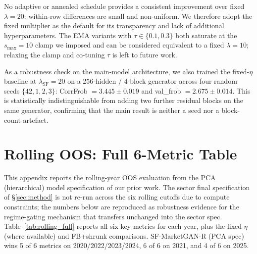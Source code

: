 No adaptive or annealed schedule provides a consistent improvement over fixed $\lambda=20$: within-row differences are small and non-uniform. We therefore adopt the fixed multiplier as the default for its transparency and lack of additional hyperparameters. The EMA variants with $\tau \in \{0.1, 0.3\}$ both saturate at the $s_\text{max}=10$ clamp we imposed and can be considered equivalent to a fixed $\lambda=10$; relaxing the clamp and co-tuning $\tau$ is left to future work.

As a robustness check on the main-model architecture, we also trained the fixed-$\eta$ baseline at $\lambda_\text{SF}{=}20$ on a 256-hidden / 4-block generator across four random seeds $\{42, 1, 2, 3\}$: CorrFrob $= 3.445 \pm 0.019$ and val\_frob $= 2.675 \pm 0.014$. This is statistically indistinguishable from adding two further residual blocks on the same generator, confirming that the main result is neither a seed nor a block-count artefact.

\section{Rolling OOS: Full 6-Metric Table}
\label{app:rolling_full}

This appendix reports the rolling-year OOS evaluation from the PCA (hierarchical) model specification of our prior work. The sector final specification of \S\ref{sec:method} is not re-run across the six rolling cutoffs due to compute constraints; the numbers below are reproduced as robustness evidence for the regime-gating mechanism that transfers unchanged into the sector spec. Table~\ref{tab:rolling_full} reports all six key metrics for each year, plus the fixed-$\eta$ (where available) and FB+shrunk comparisons. SF-MarketGAN-R (PCA spec) wins 5 of 6 metrics on 2020/2022/2023/2024, 6 of 6 on 2021, and 4 of 6 on 2025.

